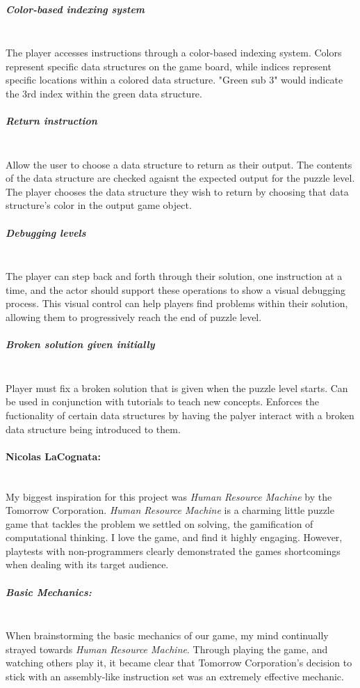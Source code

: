 \subparagraph{Color-based indexing system}\mbox{} \\
The player accesses instructions through a color-based indexing system.
Colors represent specific data structures on the game board, while indices represent
specific locations within a colored data structure. "Green sub 3" would indicate the
3rd index within the green data structure.\\

\subparagraph{Return instruction}\mbox{} \\
Allow the user to choose a data structure to return as their output. The
contents of the data structure are checked agaisnt the expected output for the
puzzle level. The player chooses the data structure they wish to return by choosing
that data structure's color in the output game object.\\

\subparagraph{Debugging levels}\mbox{} \\
The player can step back and forth through their solution, one instruction at a time,
and the actor should support these operations to show a visual debugging process. This
visual control can help players find problems within their solution, allowing them to
progressively reach the end of puzzle level.\\

\subparagraph{Broken solution given initially}\mbox{} \\
Player must fix a broken solution that is given when the puzzle level starts.
Can be used in conjunction with tutorials to teach new concepts. Enforces the fuctionality
of certain data structures by having the palyer interact with a broken data structure being
introduced to them.\\

\paragraph{Nicolas LaCognata:}\mbox{} \\
My biggest inspiration for this project was \textit{Human Resource Machine} by the Tomorrow Corporation.
\textit{Human Resource Machine} is a charming little puzzle game that tackles the problem we settled on solving,
the gamification of computational thinking. I love the game, and find it highly engaging. However, playtests
with non-programmers clearly demonstrated the games shortcomings when dealing with its target audience.

\subparagraph{Basic Mechanics:}\mbox{} \\
When brainstorming the basic mechanics of our game, my mind continually strayed towards \textit{Human Resource Machine}.
Through playing the game, and watching others play it, it became clear that Tomorrow Corporation's decision to stick with
an assembly-like instruction set was an extremely effective mechanic.\\

